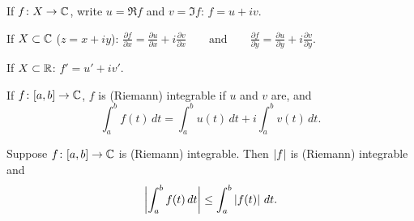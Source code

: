 \documentclass[10pt,aspectratio=169]{beamer}
\begin{document}
\begin{frame}
If $f \colon X \to {\mathbb{C}}$, write $u = \Re f$ and $v = \Im f$:
\qquad
\(\displaystyle
f = u+iv .
\)
\pause
\medskip

If $X \subset {\mathbb{C}}$ ($z = x+iy$):
\qquad
\(
\displaystyle
\frac{\partial f}{\partial x} = 
\frac{\partial u}{\partial x} + i
\frac{\partial v}{\partial x}
\qquad\text{and}\qquad
\frac{\partial f}{\partial y} = 
\frac{\partial u}{\partial y} + i
\frac{\partial v}{\partial y} .
\)
\medskip
\pause

If $X \subset {\mathbb{R}}$:
\qquad
\(
f' = u' + iv'.
\)
\medskip
\pause

If $f \colon [a,b] \to {\mathbb{C}}$, $f$
is (Riemann) integrable if $u$ and $v$ are, and
\begin{equation*}
\int_a^b f(t) \, dt = 
\int_a^b u(t) \, dt + i \int_a^b v(t) \, dt .
\end{equation*}
\pause

\begin{proposition}
Suppose $f \colon [a,b] \to {\mathbb{C}}$ is (Riemann) integrable.  Then $\lvert {f} \rvert$ is
(Riemann) integrable and
\begin{equation*}
\biggl\lvert {\int_a^b f(t) \, dt} \biggr\rvert \leq 
\int_a^b \left\lvert {f(t)} \right\rvert \, dt .
\end{equation*}
\end{proposition}

\end{frame}
\end{document}
